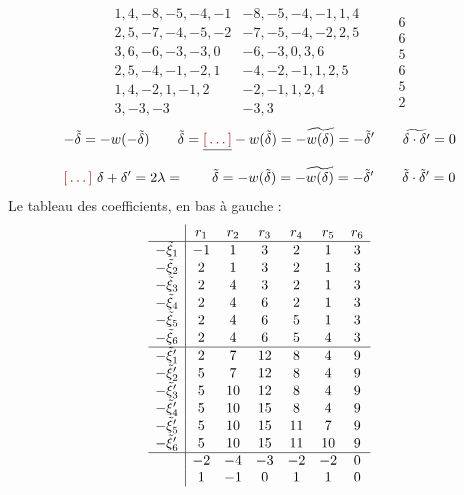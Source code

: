 \documentclass[11pt,a4paper]{article}
\begin{document}
\ill{}
\[
\begin{array}{ll}
  1,4,-8,-5,-4,-1 & -8,-5,-4,-1,1,4\\
  2,5,-7,-4,-5,-2 & -7,-5,-4,-2,2,5\\
  3,6,-6,-3,-3,0 & -6,-3,0,3,6\\
  2,5,-4,-1,-2,1 & -4,-2,-1,1,2,5\\
  1,4,-2,1,-1,2 & -2,-1,1,2,4\\
  3,-3,-3 & -3,3
\end{array}
\qquad
\begin{array}{c}6\\6\\5\\6\\5\\2\end{array}
\]
\[
  -\tilde\delta=-w(-\tilde\delta)\qquad
  \tilde\delta=\struck{\ill{}}-w(\tilde\delta)=-\widetilde{w(\delta)}
  =-\tilde\delta' \qquad \widetilde{\delta\cdot\delta'}=0
\]
\[
  \ill{}\ \delta+\delta'=2\lambda=\qquad
  \tilde\delta=-w(\tilde\delta)=-\widetilde{w(\delta)}=-\tilde\delta'
  \qquad \tilde\delta\cdot\tilde\delta'=0
\]
Le tableau des coefficients, en bas à gauche :
\[
\begin{array}{c|cccccc}
  & r_1 & r_2 & r_3 & r_4 & r_5 & r_6\\ \hline
  -\tilde\xi_1 & -1 & 1 & 3 & 2 & 1 & 3\\
  -\tilde\xi_2 & 2 & 1 & 3 & 2 & 1 & 3\\
  -\tilde\xi_3 & 2 & 4 & 3 & 2 & 1 & 3\\
  -\tilde\xi_4 & 2 & 4 & 6 & 2 & 1 & 3\\
  -\tilde\xi_5 & 2 & 4 & 6 & 5 & 1 & 3\\
  -\tilde\xi_6 & 2 & 4 & 6 & 5 & 4 & 3\\ \hline
  -\tilde\xi'_1 & 2 & 7 & 12 & 8 & 4 & 9\\
  -\tilde\xi'_2 & 5 & 7 & 12 & 8 & 4 & 9\\
  -\tilde\xi'_3 & 5 & 10 & 12 & 8 & 4 & 9\\
  -\tilde\xi'_4 & 5 & 10 & 15 & 8 & 4 & 9\\
  -\tilde\xi'_5 & 5 & 10 & 15 & 11 & 7 & 9\\
  -\tilde\xi'_6 & 5 & 10 & 15 & 11 & 10 & 9\\ \hline
  & -2 & -4 & -3 & -2 & -2 & 0\\
  & 1 & -1 & 0 & 1 & 1 & 0
\end{array}
\]
\end{document}
